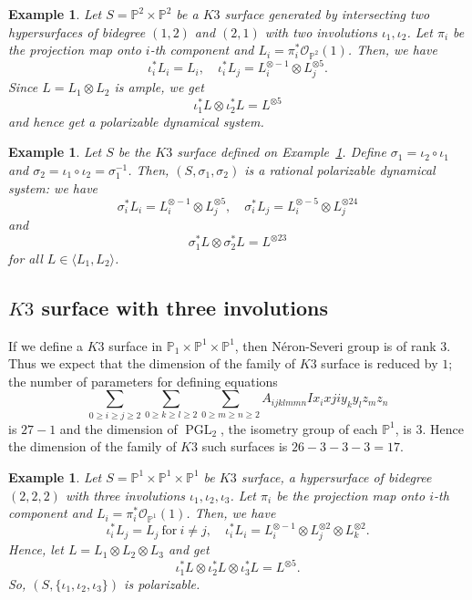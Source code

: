 \documentclass[11pt,letterpaper]{amsart}
\newtheorem{ex}[thm]{Example}
\begin{document}
    \begin{ex}\label{K3II}
        Let $S ={\mathbb{P}}^2 \times {\mathbb{P}}^2$ be a $K3$ surface generated by intersecting two hypersurfaces of bidegree $(1,2)$ and $(2,1)$ with two involutions $\iota_1, \iota_2$. Let $\pi_i$ be the projection map onto $i$-th component and $L_i = \pi_i^*{\mathcal{O}}_{{\mathbb{P}}^2}(1)$.
        Then, we have
        \[
        \iota_i^*L_i = L_i, \quad \iota_i^*L_j = L_i^{\otimes -1} \otimes L_j^{\otimes 5}.
        \]
        Since $L =L_1 \otimes L_2$ is ample, we get
        \[
        \iota_1^*L \otimes \iota_2^*L = L^{\otimes 5}
        \]
        and hence get a polarizable dynamical system.
    \end{ex}

    \begin{ex}\label{K3IIB}
         Let $S$ be the $K3$ surface defined on Example~\ref{K3II}. Define $\sigma_1 = \iota_2 \circ \iota_1$ and $\sigma_2 = \iota_1 \circ \iota_2=\sigma_1^{-1}$. Then,
        $(S, \sigma_1, \sigma_2)$ is a rational polarizable dynamical system: we have
         \[
        \sigma_i^*L_i = L_i^{\otimes -1} \otimes L_j^{\otimes 5}, \quad  \sigma_i^*L_j = L_i^{\otimes -5} \otimes L_j^{\otimes 24}
        \]
        and
        \[
        \sigma_1^*L \otimes \sigma_2^*L  = L^{\otimes 23}
        \]
        for all $L \in \langle L_1, L_2 \rangle$.
    \end{ex}

    \subsection{$K3$ surface with three involutions}

    If we define a $K3$ surface in ${\mathbb{P}}_1 \times {\mathbb{P}}^1 \times {\mathbb{P}}^1$, then N\'{e}ron-Severi group is of rank $3$. Thus we expect that the dimension of the family of $K3$ surface is reduced by $1$; the
    number of parameters for defining equations
     \[
     \sum_{0\geq i \geq j \geq 2}\sum_{0\geq k \geq l\geq 2}\sum_{0\geq m \geq n \geq 2} A_{ijklmmn}I x_{i}xji y_k y_l z_m z_n
     \]
     is $27-1$ and the dimension of ${\operatorname{PGL}}_2$, the isometry group of each ${\mathbb{P}}^1$, is 3. Hence
      the dimension of the family of $K3$ such surfaces is $26 - 3 - 3 - 3 = 17$.
    
    \begin{ex}\label{K3III}
        Let $S = {\mathbb{P}}^1 \times {\mathbb{P}}^1 \times {\mathbb{P}}^1$ be $K3$ surface, a hypersurface of bidegree $(2,2,2)$ with three involutions $\iota_1, \iota_2, \iota_3$. Let $\pi_i$ be the projection map onto $i$-th component and $L_i = \pi_i^*{\mathcal{O}}_{{\mathbb{P}}^1}(1)$. Then, we have
        \[
        \iota_i^*L_j = L_j~\text{for}~i\neq j, \quad \iota_i^*L_i = L_i^{\otimes -1} \otimes  L_j^{\otimes2} \otimes L_k^{\otimes2}.
        \]
        Hence, let $L =L_1 \otimes L_2 \otimes L_3$ and get
        \[
        \iota_1^*L \otimes \iota_2^*L \otimes \iota_3^*L = L^{\otimes 5}.
        \]
        So, $(S, \{\iota_1, \iota_2, \iota_3\})$ is polarizable.
    \end{ex}
\end{document}
